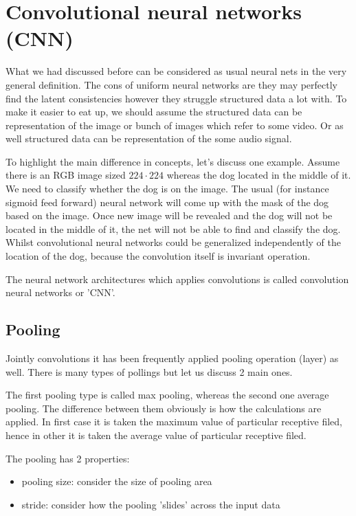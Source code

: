 \section{Convolutional neural networks (CNN)}
What we had discussed before can be considered as usual neural nets in the very general definition. The cons of uniform neural networks are they may perfectly find the latent consistencies however they struggle structured data a lot with. To make it easier to eat up, we should assume the structured data can be representation of the image or bunch of images which refer to some video. Or as well structured data can be representation of the some audio signal.

To highlight the main difference in concepts, let's discuss one example.
Assume there is an RGB image sized $224 \cdot 224$ whereas the dog located in the middle of it. We need to classify whether the dog is on the image. The usual (for instance sigmoid feed forward) neural network will come up with the mask of the dog based on the image. Once new image will be revealed and the dog will not be located in the middle of it, the net will not be able to find and classify the dog. Whilst convolutional neural networks could be generalized independently of the location of the dog, because the convolution itself is invariant operation.         

The neural network architectures which applies convolutions is called convolution neural networks or 'CNN'.    



\subsection{Pooling}
Jointly convolutions it has been frequently applied pooling operation (layer) as well. There is many types of pollings but let us discuss 2 main ones. 

The first pooling type is called max pooling, whereas the second one average pooling. The difference between them obviously is how the calculations are applied. In first case it is taken the maximum value of particular receptive filed, hence in other it is taken the average value of particular receptive filed.

The pooling has 2 properties:
\begin{itemize}
    \item pooling size: consider the size of pooling area 
    \item stride: consider how the pooling 'slides' across the input data 
\end{itemize}    

